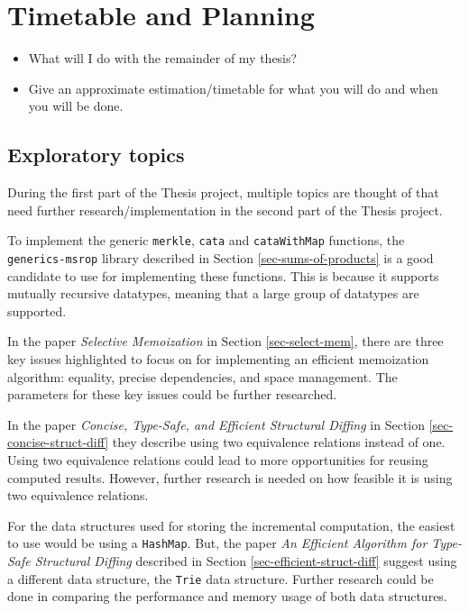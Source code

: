 \section{Timetable and Planning}
\begin{itemize}
    \item What will I do with the remainder of my thesis?
    \item Give an approximate estimation/timetable for what you will do and when you will be done.    
\end{itemize}

\subsection{Exploratory topics}
During the first part of the Thesis project, multiple topics are thought of that need further research/implementation in the second part of the Thesis project.

To implement the generic \texttt{merkle}, \texttt{cata} and \texttt{cataWithMap} functions, the \texttt{generics-msrop} library described in Section \ref{sec-sums-of-products} is a good candidate to use for implementing these functions. This is because it supports mutually recursive datatypes, meaning that a large group of datatypes are supported. 

In the paper \textit{Selective Memoization} in Section \ref{sec-select-mem}, there are three key issues highlighted to focus on for implementing an efficient memoization algorithm: equality, precise dependencies, and space management. The parameters for these key issues could be further researched.

In the paper \textit{Concise, Type-Safe, and Efficient Structural Diffing} in Section \ref{sec-concise-struct-diff} they describe using two equivalence relations instead of one. Using two equivalence relations could lead to more opportunities for reusing computed results. However, further research is needed on how feasible it is using two equivalence relations. 

For the data structures used for storing the incremental computation, the easiest to use would be using a \texttt{HashMap}. But, the paper \textit{An Efficient Algorithm for Type-Safe Structural Diffing} described in Section \ref{sec-efficient-struct-diff} suggest using a different data structure, the \texttt{Trie} data structure. Further research could be done in comparing the performance and memory usage of both data structures.

\newpage
